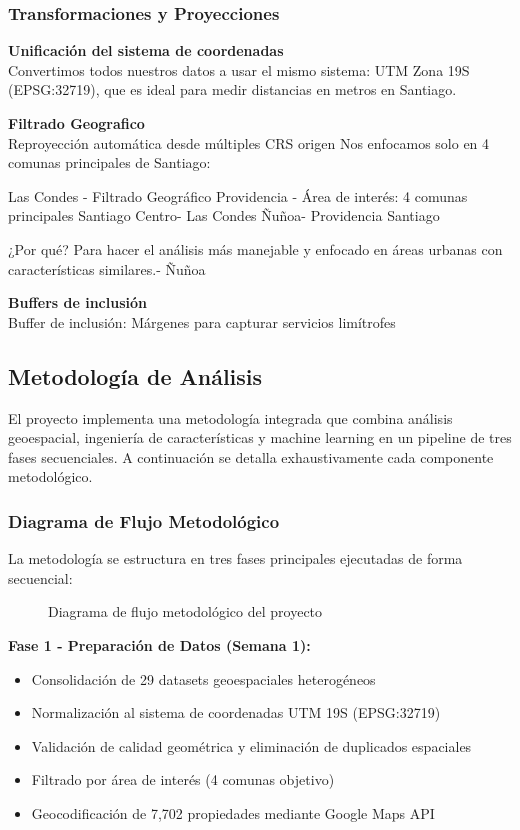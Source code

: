 \subsubsection{Transformaciones y Proyecciones}

\textbf{Unificación del sistema de coordenadas}\\
Convertimos todos nuestros datos a usar el mismo sistema: UTM Zona 19S (EPSG:32719), que es ideal para medir distancias en metros en Santiago.

\textbf{Filtrado Geografico}\\
Reproyección automática desde múltiples CRS origen
Nos enfocamos solo en 4 comunas principales de Santiago:

Las Condes - Filtrado Geográfico
Providencia - Área de interés: 4 comunas principales
Santiago Centro- Las Condes
Ñuñoa- Providencia
Santiago

¿Por qué? Para hacer el análisis más manejable y enfocado en áreas urbanas con características similares.- Ñuñoa

\textbf{Buffers de inclusión}\\
Buffer de inclusión: Márgenes para capturar servicios limítrofes


\subsection{Metodología de Análisis}

El proyecto implementa una metodología integrada que combina análisis geoespacial, ingeniería de características y machine learning en un pipeline de tres fases secuenciales. A continuación se detalla exhaustivamente cada componente metodológico.

\subsubsection{Diagrama de Flujo Metodológico}

La metodología se estructura en tres fases principales ejecutadas de forma secuencial:

\begin{figure}[H]
    \centering
    \caption{Diagrama de flujo metodológico del proyecto}
    \label{fig:flujo}
\end{figure}

\textbf{Fase 1 - Preparación de Datos (Semana 1):}
\begin{itemize}
    \item Consolidación de 29 datasets geoespaciales heterogéneos
    \item Normalización al sistema de coordenadas UTM 19S (EPSG:32719)
    \item Validación de calidad geométrica y eliminación de duplicados espaciales
    \item Filtrado por área de interés (4 comunas objetivo)
    \item Geocodificación de 7,702 propiedades mediante Google Maps API
\end{itemize}

